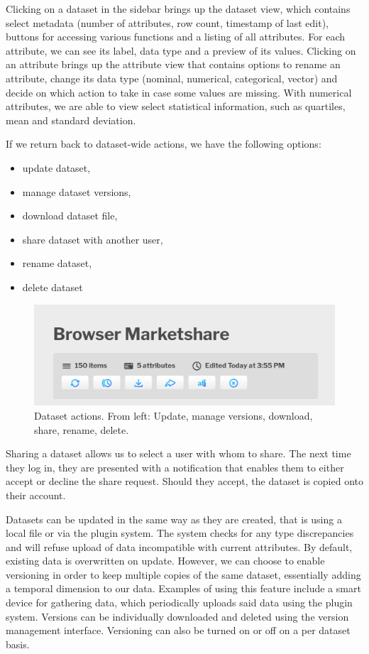 \documentclass[thesis=M,english,hidelinks]{FITthesisXE}[2012/06/26]
\begin{document}
Clicking on a dataset in the sidebar brings up the dataset view, which contains select metadata (number of attributes, row count, timestamp of last edit), buttons for accessing various functions and a listing of all attributes. For each attribute, we can see its label, data type and a preview of its values. Clicking on an attribute brings up the attribute view that contains options to rename an attribute, change its data type (nominal, numerical, categorical, vector) and decide on which action to take in case some values are missing. With numerical attributes, we are able to view select statistical information, such as quartiles, mean and standard deviation.

If we return back to dataset-wide actions, we have the following options:

\begin{itemize}
\item update dataset,
\item manage dataset versions,
\item download dataset file,
\item share dataset with another user,
\item rename dataset,
\item delete dataset
\end{itemize}

\begin{figure}[ht]
\centering
\includegraphics[scale=0.3]{manager_actions}
\caption{Dataset actions. From left: Update, manage versions, download, share, rename, delete.}
\label{fig:manager_actions}
\end{figure}

Sharing a dataset allows us to select a user with whom to share. The next time they log in, they are presented with a notification that enables them to either accept or decline the share request. Should they accept, the dataset is copied onto their account.

Datasets can be updated in the same way as they are created, that is using a local file or via the plugin system. The system checks for any type discrepancies and will refuse upload of data incompatible with current attributes. By default, existing data is overwritten on update. However, we can choose to enable versioning in order to keep multiple copies of the same dataset, essentially adding a temporal dimension to our data. Examples of using this feature include a smart device for gathering data, which periodically uploads said data using the plugin system. Versions can be individually downloaded and deleted using the version management interface. Versioning can also be turned on or off on a per dataset basis.
\end{document}

